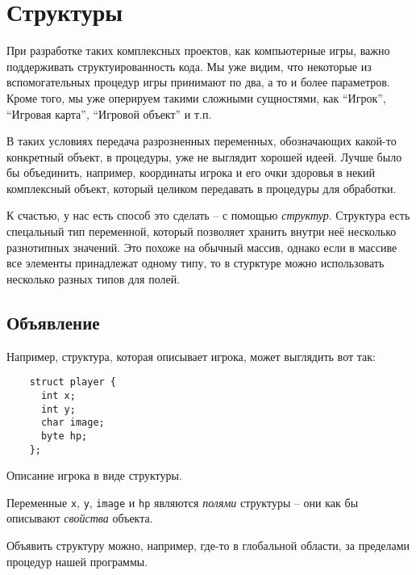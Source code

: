 \documentclass[../sparc.tex]{subfiles}
\begin{document}
\section{Структуры}

При разработке таких комплексных проектов, как компьютерные игры, важно
поддерживать структуированность кода.  Мы уже видим, что некоторые из
вспомогательных процедур игры принимают по два, а то и более параметров.  Кроме
того, мы уже оперируем такими сложными сущностями, как ``Игрок'', ``Игровая
карта'', ``Игровой объект'' и т.п.

В таких условиях передача разрозненных переменных, обозначающих какой-то
конкретный объект, в процедуры, уже не выглядит хорошей идеей.  Лучше было бы
объединить, например, координаты игрока и его очки здоровья в некий комплексный
объект, который целиком передавать в процедуры для обработки.

К счастью, у нас есть способ это сделать -- с помощью \emph{структур}.  Структура
есть спецальный тип переменной, который позволяет хранить внутри неё несколько
разнотипных значений.  Это похоже на обычный массив, однако если в массиве все
элементы принадлежат одному типу, то в стурктуре можно использовать несколько
разных типов для полей.

\subsection{Объявление}

Например, структура, которая описывает игрока, может выглядить вот так:

\begin{listing}[H]
  \begin{verbatim}
    struct player {
      int x;
      int y;
      char image;
      byte hp;
    };
  \end{verbatim}
  \caption{Описание игрока в виде структуры.}
  \label{listing:game-dev-structure}
\end{listing}

Переменные \texttt{x}, \texttt{y}, \texttt{image} и
\texttt{hp} являются \emph{полями} структуры -- они как бы описывают
\emph{свойства} объекта.

Объявить структуру можно, например, где-то в глобальной области, за пределами
процедур нашей программы.
\end{document}
